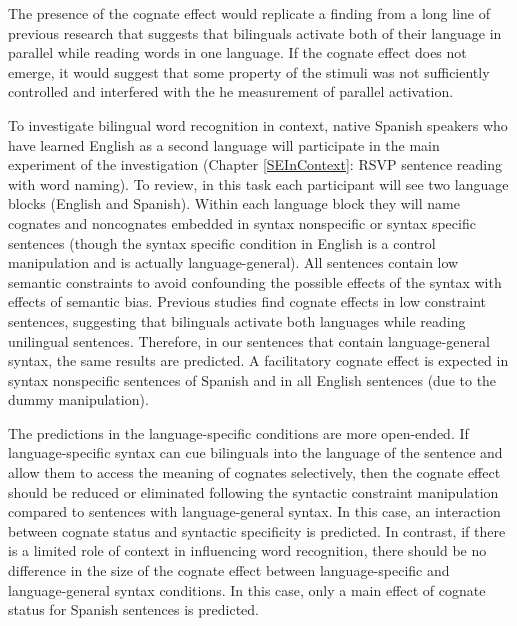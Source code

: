 The presence of the cognate effect would replicate a finding from a long line of previous research that suggests that bilinguals activate both of their language in parallel while reading words in one language. If the cognate effect does not emerge, it would suggest that some property of the stimuli was not sufficiently controlled and interfered with the he measurement of parallel activation.

To investigate bilingual word recognition in context, native Spanish speakers who have learned English as a second language will participate in the main experiment of the investigation (Chapter \ref{SEInContext}: RSVP sentence reading with word naming). To review, in this task each participant will see two language blocks (English and Spanish). Within each language block they will name cognates and noncognates embedded in syntax nonspecific or syntax specific sentences (though the syntax specific condition in English is a control manipulation and is actually language-general).  All sentences contain low semantic constraints to avoid confounding the possible effects of the syntax with effects of semantic bias. Previous studies find cognate effects in low constraint sentences, suggesting that bilinguals activate both languages while reading unilingual sentences. Therefore, in our sentences that contain language-general syntax, the same results are predicted. A facilitatory cognate effect is expected in syntax nonspecific sentences of Spanish and in all English sentences (due to the dummy manipulation). 

The predictions in the language-specific conditions are more open-ended. If language-specific syntax can cue bilinguals into the language of the sentence and allow them to access the meaning of cognates selectively, then the cognate effect should be reduced or eliminated following the syntactic constraint manipulation compared to sentences with language-general syntax. In this case, an interaction between cognate status and syntactic specificity is predicted. In contrast, if there is a limited role of context in influencing word recognition, there should be no difference in the size of the cognate effect between language-specific and language-general syntax conditions. In this case, only a main effect of cognate status for Spanish sentences is predicted. 

